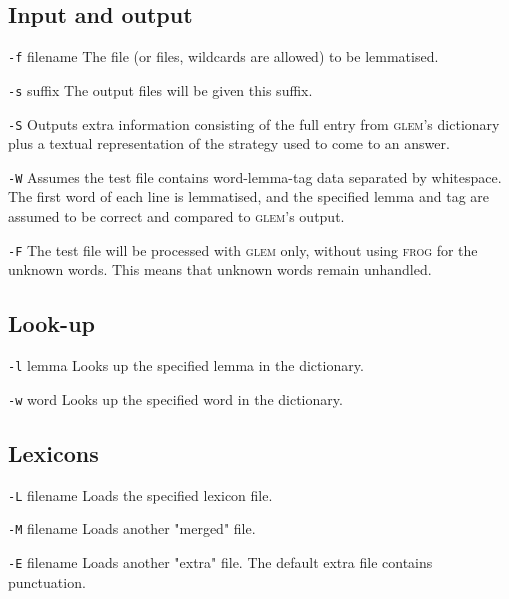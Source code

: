 \documentclass[a4paper]{article}
\def\glem{\textsc{glem}}
\def\frog{\textsc{frog}}
\newenvironment{varlist}[1]{%
\begin{list}{}{%
    \settowidth{\labelwidth}{\sf #1 }     %
    \setlength{\leftmargin}{\labelwidth}  %
    \addtolength{\leftmargin}{\labelsep}  %
    \setlength{\parsep}{0.5ex plus 0.2ex minus 0.2ex}
    \setlength{\itemsep}{0.3ex}
    \renewcommand{\makelabel}[1]{\sf ##1\hfill}}}%
{\end{list}}
\begin{document}
\begin{varlist}{wwwwwwww}

\subsection*{Input and output}

\item[\texttt{-f} filename] The file (or files, wildcards are allowed) to
  be lemmatised.

\item[\texttt{-s} suffix] The output files will be given this suffix.

\item[\texttt{-S}] Outputs extra information consisting of the full entry from
  \glem{}'s dictionary plus a textual representation of the strategy used to
  come to an answer.

\item[\texttt{-W}] Assumes the test file contains word-lemma-tag data
  separated by whitespace. The first word of each line is lemmatised, and the
  specified lemma and tag are assumed to be correct and compared to \glem{}'s output.

\item[\texttt{-F}] The test file will be processed with \glem{}
  only, without using \frog{} for the unknown words. This means that unknown words remain unhandled.

\subsection*{Look-up}

\item[\texttt{-l} lemma] Looks up the specified lemma in
  the dictionary.

\item[\texttt{-w} word] Looks up the specified word in the dictionary.

\subsection*{Lexicons}

\item[\texttt{-L} filename] Loads the specified lexicon file. 

\item[\texttt{-M} filename] Loads another "merged" file.

\item[\texttt{-E} filename] Loads another "extra" file. The
  default extra file contains punctuation.


\end{varlist}
\end{document}

